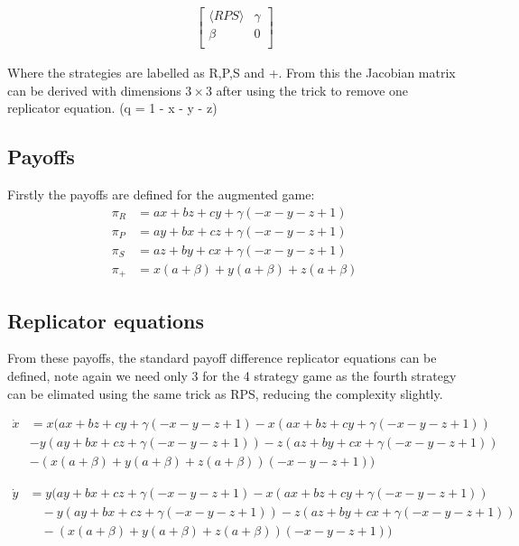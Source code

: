 \documentclass{article}
\begin{document}
\begin{align} \nonumber
\label{CompositeGame}
\begin{bmatrix}
    \langle RPS \rangle & \gamma\\
    \beta & 0 \\
\end{bmatrix}
\end{align}

Where the strategies are labelled as R,P,S and +.
From this the Jacobian matrix can be derived with dimensions $3 \times 3$ after using the trick to remove one replicator equation. (q = 1 - x - y - z)

\subsection{Payoffs}
Firstly the payoffs are defined for the augmented game:
\begin{align}
    \pi_R &= a x + b z + c y + \gamma (- x - y - z + 1)\\
    \pi_P &= a y + b x + c z + \gamma (- x - y - z +1) \\
    \pi_S &= a z + b y + c x + \gamma (- x - y - z + 1)\\
    \pi_+ &= x (a + \beta) + y (a + \beta) + z (a + \beta)
\end{align}

\subsection{Replicator equations}

From these payoffs, the standard payoff difference replicator equations can be defined, 
note again we need only 3 for the 4 strategy game as the fourth strategy can be 
elimated using the same trick as RPS, reducing the complexity slightly.

\begin{align} 
    \dot x &= x (a x + b z + c y + \gamma (- x - y - z + 1) - x (a x + b z + c y + \gamma (- x - y - z + 1)) \nonumber \\
    &- y (a y + b x + c z + \gamma (- x - y - z + 1)) - z (a z + b y + c x + \gamma (- x - y - z + 1)) \nonumber \\
    &- (x (a + \beta) + y (a + \beta) + z (a + \beta)) (- x - y - z + 1))
\end{align}

\begin{align}
\dot{y} &= y \big(a y + b x + c z + \gamma (-x - y - z + 1)
- x (a x + b z + c y + \gamma (-x - y - z + 1)) \nonumber \\
&\quad - y (a y + b x + c z + \gamma (-x - y - z + 1))
- z (a z + b y + c x + \gamma (-x - y - z + 1)) \nonumber \\
&\quad - (x (a + \beta) + y (a + \beta) + z (a + \beta)) (-x - y - z + 1) \big)
\end{align}
\end{document}
